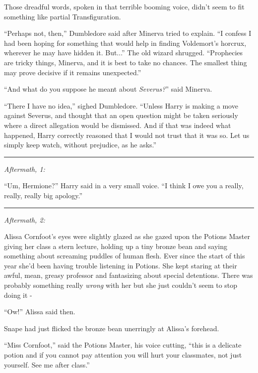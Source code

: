 Those dreadful words, spoken in that terrible booming voice, didn't seem to fit something like partial Transfiguration.

``Perhaps not, then,'' Dumbledore said after Minerva tried to explain. ``I confess I had been hoping for something that would help in finding Voldemort's horcrux, wherever he may have hidden it. But...'' The old wizard shrugged. ``Prophecies are tricky things, Minerva, and it is best to take no chances. The smallest thing may prove decisive if it remains unexpected.''

``And what do you suppose he meant about \emph{Severus?}'' said Minerva.

``There I have no idea,'' sighed Dumbledore. ``Unless Harry is making a move against Severus, and thought that an open question might be taken seriously where a direct allegation would be dismissed. And if that was indeed what happened, Harry correctly reasoned that I would not trust that it was so. Let us simply keep watch, without prejudice, as he asks.''

\begin{center}\rule{3in}{0.4pt}\end{center}

\emph{Aftermath, 1:}

``Um, Hermione?'' Harry said in a very small voice. ``I think I owe you a really, really, really big apology.''

\begin{center}\rule{3in}{0.4pt}\end{center}

\emph{Aftermath, 2:}

Alissa Cornfoot's eyes were slightly glazed as she gazed upon the Potions Master giving her class a stern lecture, holding up a tiny bronze bean and saying something about screaming puddles of human flesh. Ever since the start of this year she'd been having trouble listening in Potions. She kept staring at their awful, mean, greasy professor and fantasizing about special detentions. There was probably something really \emph{wrong} with her but she just couldn't seem to stop doing it -

``Ow!'' Alissa said then.

Snape had just flicked the bronze bean unerringly at Alissa's forehead.

``Miss Cornfoot,'' said the Potions Master, his voice cutting, ``this is a delicate potion and if you cannot pay attention you will hurt your classmates, not just yourself. See me after class.''

